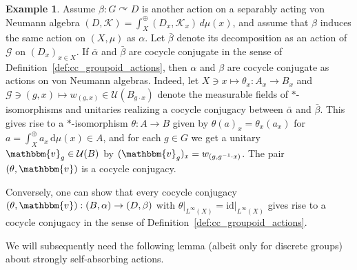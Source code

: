 \documentclass[11pt,a4paper]{article}
\theoremstyle{definition}
\newtheorem{example}[theorem]{Example}
\theoremstyle{remark}
\numberwithin{equation}{section}
\numberwithin{theorem}{section}
\newcommand{\acts}{\curvearrowright}
\begin{document}
\begin{example}
Assume $\beta\colon G \acts D$ is another action on a separably acting von Neumann algebra $(D, \mathcal{K}) = \int_X^\oplus (D_x, \mathcal{K}_x)\, d\mu(x)$, and assume that $\beta$ induces the same action on $(X,\mu)$ as $\alpha$. 
Let $\bar{\beta}$ denote its decomposition as an action of $\mathcal{G}$ on $(D_x)_{x \in X}$. 
If $\bar{\alpha}$ and $\bar{\beta}$ are cocycle conjugate in the sense of Definition~\ref{def:cc_groupoid_actions}, then $\alpha$ and $\beta$ are cocycle conjugate as actions on von Neumann algebras.
Indeed, let $X \ni x \mapsto \theta_x\colon A_x \rightarrow B_x$ and $\mathcal{G} \ni (g,x) \mapsto w_{(g,x)} \in \mathcal{U}(B_{g \cdot x})$ denote the measurable fields of $*$-isomorphisms and unitaries realizing a cocycle conjugacy between $\bar{\alpha}$ and $\bar{\beta}$.
This gives rise to a $*$-isomorphism $\theta\colon A \rightarrow B$ given by $\theta(a)_x = \theta_x(a_x)$ for $a = \int_X^\oplus a_x\, \mathrm{d} \mu(x) \in A$, and for each $g \in G$ we get a unitary $\mathbbm{v}_g \in \mathcal{U}(B)$ by
$(\mathbbm{v}_g)_x = w_{(g, g^{-1}\cdot x)}$. The pair $(\theta, \mathbbm{v})$ is a cocycle conjugacy.

Conversely, one can show that every cocycle conjugacy $(\theta, \mathbbm{v}):(B, \alpha) \rightarrow (D, \beta)$ with $\theta\big\lvert_{L^\infty(X)} =  \mathrm{id}\big\lvert_{L^\infty(X)}$ gives rise to a cocycle conjugacy in the sense of Definition~\ref{def:cc_groupoid_actions}.
\end{example}

We will subsequently need the following lemma (albeit only for discrete groups) about strongly self-absorbing actions.
\end{document}
